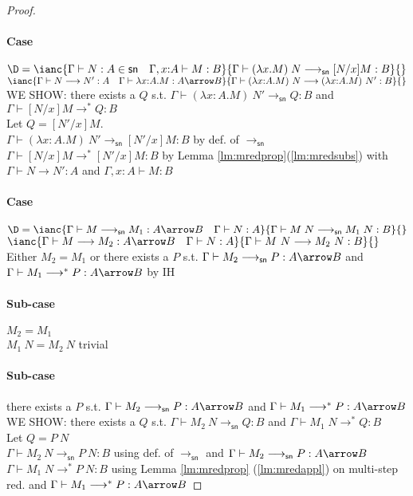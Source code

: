 \documentclass{article}
\newcommand{\csn}{\mathsf{sn}}
\newcommand{\mred}{\longrightarrow^*}
\newcommand{\red}{\longrightarrow}
\newcommand{\redsn}{\longrightarrow_\csn}
\begin{document}
\begin{proof}
\paragraph{Case}
$\D = \ianc{\Gamma \vdash N : A \in \csn \quad \Gamma, x{:}A \vdash M : B}{\Gamma \vdash (\lambda x.M)\;N \redsn [N/x]M : B}{}$
\qquad
$\ianc {\Gamma \vdash N\red N' : A  \quad \Gamma \vdash \lambda x{:}A.M : A \arrow B}
       {\Gamma \vdash (\lambda x{:}A.M)~N  \red (\lambda x{:}A.M)~N' : B }{}$
\\[1em]
WE SHOW: there exists a $Q$ s.t. $\Gamma \vdash (\lambda x{:}A.M)~N' \redsn Q : B$ and $\Gamma \vdash  [N/x]M \mred Q : B$\\[0.5em]
Let $Q = [N'/x]M$.\\
$\Gamma \vdash (\lambda x{:}A.M)~N' \redsn [N'/x]M : B$ \hfill by def. of $\redsn$\\
$\Gamma \vdash [N/x]M \mred [N'/x]M : B $ \hfill by Lemma \ref{lm:mredprop}(\ref{lm:mredsubs}) with $\Gamma \vdash N\red N' : A$ and $\Gamma, x{:}A \vdash M : B$

\paragraph{Case}
$\D  = \ianc{\Gamma \vdash M \redsn M_1 : A \arrow B \quad \Gamma \vdash N : A}
            {\Gamma \vdash M\;N \redsn M_1\;N : B}{}$
\qquad
$\ianc {\Gamma \vdash M \red M_2 : A \arrow B \quad \Gamma \vdash N : A}
       {\Gamma \vdash M~N  \red M_2~N : B}{}$
\\[1em]
Either $M_2 = M_1$ or there exists a $P$ s.t. $\Gamma \vdash M_2 \redsn P : A \arrow B$ and $\Gamma \vdash M_1 \mred P : A \arrow B$ \hfill by IH

\paragraph{Sub-case}$M_2 = M_1$
\\[0.5em]
$M_1~N = M_2~N$ \hfill trivial


\paragraph{Sub-case} there exists a $P$ s.t. $\Gamma \vdash M_2 \redsn P : A \arrow B$ and $\Gamma \vdash M_1 \mred P : A \arrow B$\\[1em]
WE SHOW: there exists a $Q$ s.t. $\Gamma \vdash M_2~N \redsn Q : B$ and $\Gamma \vdash  M_1\;N \mred Q : B$
\\[0.5em]
Let $Q = P~N$\\[0.5em]
$\Gamma \vdash M_2~N \redsn P~N : B$ \hfill using def. of $\redsn$ and $\Gamma \vdash M_2 \redsn P : A \arrow B$\\
$\Gamma \vdash M_1\;N \mred P~N : B$ \hfill using Lemma \ref{lm:mredprop} (\ref{lm:mredappl}) on multi-step red. and $\Gamma \vdash M_1 \mred P : A \arrow B$



\end{proof}
\end{document}
